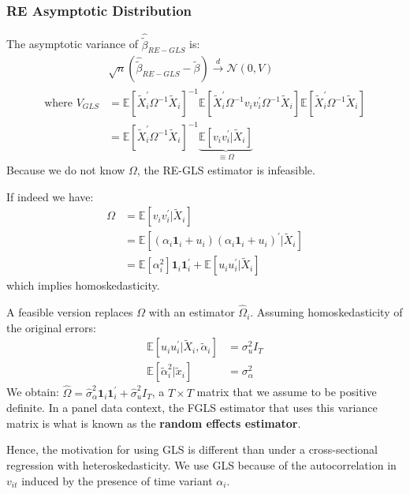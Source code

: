 \subsubsection{RE Asymptotic Distribution}
The asymptotic variance of $\hat{\tilde{\beta}}_{RE-GLS}$ is:
\begin{align*}
    &\sqrt{n} \left( \hat{\tilde{\beta}}_{RE-GLS} - \tilde{\beta} \right) \overset{d}{\rightarrow} \mathcal{N}\left(0, V \right) \\
    \text{where } V_{GLS}  &= \mathbb{E}\left[\tilde{X}_i^{\prime} \Omega^{-1} \tilde{X}_i \right]^{-1} \mathbb{E}\left[\tilde{X}_i^{\prime} \Omega^{-1} v_i v_i^{\prime} \Omega^{-1} \tilde{X}_i \right] \mathbb{E}\left[\tilde{X}_i^{\prime} \Omega^{-1} \tilde{X}_i \right] \\
    &= \mathbb{E}\left[\tilde{X}_i^{\prime} \Omega^{-1} \tilde{X}_i \right]^{-1} \underset{\equiv \Omega}{\underbrace{\mathbb{E}[v_i v_i^{\prime} | \tilde{X}_i]}}
\end{align*}
Because we do not know $\Omega$, the RE-GLS estimator is infeasible. 

If indeed we have:
\begin{align*}
    \Omega &= \mathbb{E}[v_i v_i^{\prime}  | \tilde{X}_i] \\
    &= \mathbb{E}[(\alpha_i \mathbf{1}_i + u_i)(\alpha_i \mathbf{1}_i  + u_i)^{\prime}  | \tilde{X}_i] \\
    &= \mathbb{E}[\alpha_i^2] \mathbf{1}_i \mathbf{1}_i^{\prime} + \mathbb{E}[u_i u_i^{\prime} | \tilde{X}_i]
\end{align*}
which implies homoskedasticity.

A feasible version replaces $\Omega$ with an estimator $\hat{\Omega}_i$.
Assuming homoskedasticity of the original errors:
\begin{align*}
    \mathbb{E}[u_i u_i^{\prime}  | \tilde{X}_i, \tilde{\alpha}_i] &= \sigma_u^2 I_T \\
    \mathbb{E}[\tilde{\alpha}_i^2 | \tilde{x}_i] &= \sigma_{\alpha}^2
\end{align*}
We obtain: $\hat{\Omega} = \hat{\sigma}_{\alpha}^2 \mathbf{1}_i \mathbf{1}_i^{\prime} + \hat{\sigma}_u^2 I_T$, 
a $T \times T$ matrix that we assume to be positive definite.
In a panel data context, the FGLS estimator that uses this variance matrix is what is known as the \textbf{random effects estimator}.

Hence, the motivation for using GLS is different than under a cross-sectional regression with heteroskedasticity.
We use GLS because of the autocorrelation in $v_{it}$ induced by the presence of time variant $\alpha_i$.


